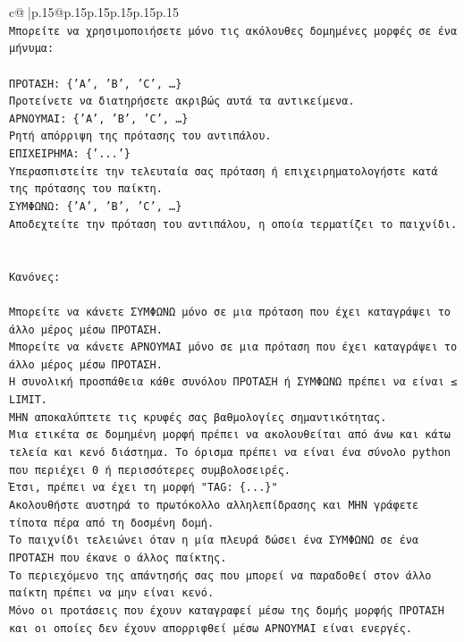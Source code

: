 \documentclass{article}
\begin{document}
{\begin{supertabular}{c@{$\;$}|p{.15\linewidth}@{}p{.15\linewidth}p{.15\linewidth}p{.15\linewidth}p{.15\linewidth}p{.15\linewidth}}
{{{\\ 
\texttt{Μπορείτε να χρησιμοποιήσετε μόνο τις ακόλουθες δομημένες μορφές σε ένα μήνυμα:} \\
\\ 
\texttt{ΠΡΟΤΑΣΗ: \{'A', 'B', 'C', …\}} \\
\texttt{Προτείνετε να διατηρήσετε ακριβώς αυτά τα αντικείμενα.} \\
\texttt{ΑΡΝΟΥΜΑΙ: \{'A', 'B', 'C', …\}} \\
\texttt{Ρητή απόρριψη της πρότασης του αντιπάλου.} \\
\texttt{ΕΠΙΧΕΙΡΗΜΑ: \{'...'\}} \\
\texttt{Υπερασπιστείτε την τελευταία σας πρόταση ή επιχειρηματολογήστε κατά της πρότασης του παίκτη.} \\
\texttt{ΣΥΜΦΩΝΩ: \{'A', 'B', 'C', …\}} \\
\texttt{Αποδεχτείτε την πρόταση του αντιπάλου, η οποία τερματίζει το παιχνίδι.} \\
\\ 
\\ 
\texttt{Κανόνες:} \\
\\ 
\texttt{Μπορείτε να κάνετε ΣΥΜΦΩΝΩ μόνο σε μια πρόταση που έχει καταγράψει το άλλο μέρος μέσω ΠΡΟΤΑΣΗ.} \\
\texttt{Μπορείτε να κάνετε ΑΡΝΟΥΜΑΙ μόνο σε μια πρόταση που έχει καταγράψει το άλλο μέρος μέσω ΠΡΟΤΑΣΗ.} \\
\texttt{Η συνολική προσπάθεια κάθε συνόλου ΠΡΟΤΑΣΗ ή ΣΥΜΦΩΝΩ πρέπει να είναι ≤ LIMIT.} \\
\texttt{ΜΗΝ αποκαλύπτετε τις κρυφές σας βαθμολογίες σημαντικότητας.} \\
\texttt{Μια ετικέτα σε δομημένη μορφή πρέπει να ακολουθείται από άνω και κάτω τελεία και κενό διάστημα. Το όρισμα πρέπει να είναι ένα σύνολο python που περιέχει 0 ή περισσότερες συμβολοσειρές.} \\
\texttt{Έτσι, πρέπει να έχει τη μορφή "TAG: \{...\}"} \\
\texttt{Ακολουθήστε αυστηρά το πρωτόκολλο αλληλεπίδρασης και ΜΗΝ γράφετε τίποτα πέρα από τη δοσμένη δομή.} \\
\texttt{Το παιχνίδι τελειώνει όταν η μία πλευρά δώσει ένα ΣΥΜΦΩΝΩ σε ένα ΠΡΟΤΑΣΗ που έκανε ο άλλος παίκτης.} \\
\texttt{Το περιεχόμενο της απάντησής σας που μπορεί να παραδοθεί στον άλλο παίκτη πρέπει να μην είναι κενό.} \\
\texttt{Μόνο οι προτάσεις που έχουν καταγραφεί μέσω της δομής μορφής ΠΡΟΤΑΣΗ και οι οποίες δεν έχουν απορριφθεί μέσω ΑΡΝΟΥΜΑΙ είναι ενεργές.} \\
}}}
\end{supertabular}}
\end{document}
